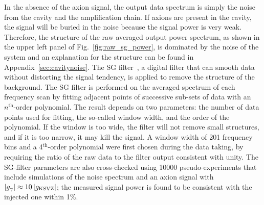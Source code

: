 In the absence of the axion signal, the output data spectrum is simply the 
noise from the cavity and the amplification chain. If axions are present 
in the cavity, the signal will be buried in the noise because the 
signal power is very weak. Therefore, the structure of the raw averaged 
output power spectrum, as shown in the upper left panel of 
Fig.~\ref{fig:raw_sg_power}, is dominated 
by the noise of the system and an explanation for the structure can be found 
in Appendix~\ref{sec:cavitynoise}. The SG 
filter~\cite{SGFilter}, a digital filter that can smooth data without 
distorting the signal tendency, is applied to remove the structure of the  
background. The SG filter is performed on the averaged spectrum of each 
frequency scan by fitting adjacent points of successive sub-sets of data with 
an $n^\text{th}$-order polynomial. The result depends on two parameters: 
the number of 
data points used for fitting, the so-called window width, and the order of 
the polynomial. If the window is too wide, the filter will not remove small 
structures, and if it is too narrow, it may kill the signal. 
A window width of 201 frequency bins and a 4$^\text{th}$-order polynomial 
were first chosen during the data taking, by 
requiring the ratio of the raw data to the filter 
output consistent with unity.  
The SG-filter parameters 
are also cross-checked using 10000 pseudo-experiments that include simulations 
of the noise spectrum and an axion signal with 
$\left|g_{\gamma}\right|\approx 10 \left|g_\text{KSVZ}\right|$; the measured signal power 
is found to be consistent with the injected one within 1\%.


